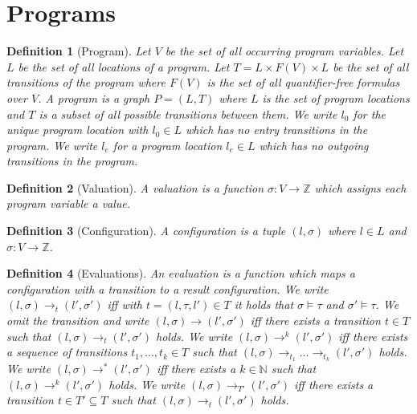 \documentclass{scrartcl}
\newtheorem{definition}{Definition}
\begin{document}
\section{Programs}

\begin{definition}[Program] 
	Let $V$ be the set of all occurring program variables.
	Let $L$ be the set of all locations of a program.
	Let $T = L \times F(V) \times L$ be the set of all transitions of the program where $F(V)$ is the set of all quantifier-free formulas over $V$.
	A program is a graph $P = (L, T)$ where $L$ is the set of program locations and $T$ is a subset of all possible transitions between them.
	We write $l_0$ for the unique program location with $l_0 \in L$ which has no entry transitions in the program.
	We write $l_e$ for a program location $l_e \in L$ which has no outgoing transitions in the program.
\end{definition}

\begin{definition}[Valuation] 
	A valuation is a function $\sigma: V \rightarrow \mathbb{Z}$ which assigns each program variable a value.
\end{definition}

\begin{definition}[Configuration] 
	A configuration is a tuple $(l, \sigma)$ where $l \in L$ and $\sigma: V \rightarrow \mathbb{Z}$.
\end{definition}

\begin{definition}[Evaluations] 
	An evaluation is a function which maps a configuration with a transition to a result configuration.
	We write $(l, \sigma) \rightarrow_t (l', \sigma')$ iff with $t = (l, \tau, l') \in T$ it holds that $\sigma \models \tau$ and $\sigma' \models \tau$.
	We omit the transition and write $(l, \sigma) \rightarrow (l', \sigma')$ iff there exists a transition $t \in T$ such that $(l, \sigma) \rightarrow_t (l', \sigma')$ holds.
	We write $(l, \sigma) \rightarrow^k (l', \sigma')$ iff there exists a sequence of transitions $t_1, \dots, t_k \in T$ such that $(l, \sigma) \rightarrow_{t_1} \dots \rightarrow_{t_k} (l', \sigma')$ holds.
	We write $(l, \sigma) \rightarrow^* (l', \sigma')$ iff there exists a $k \in \mathbb{N}$ such that $(l, \sigma) \rightarrow^k (l', \sigma')$ holds.
	We write $(l, \sigma) \rightarrow_{T'} (l', \sigma')$ iff there exists a transition $t \in T' \subseteq T$ such that $(l, \sigma) \rightarrow_t (l', \sigma')$ holds.
\end{definition}
\end{document}
